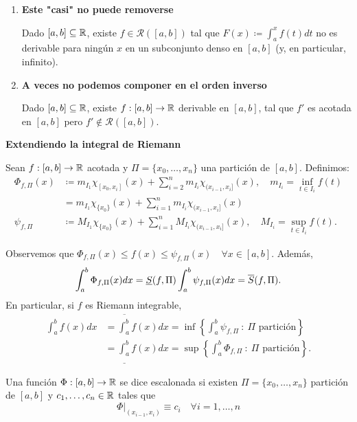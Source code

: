 \documentclass[a4paper]{report}
\begin{document}
	\begin{enumerate}
		\item \textbf{Este "casi" no puede removerse}
		\begin{theorem}[Hankel, 1871]
			Dado $[a,b] \subseteq \mathbb{R}$, existe $f\in\mathcal{R}([a,b])$ tal que $F(x) \coloneq \int_{a}^{x} f(t) dt$ no es derivable para ningún $x$ en un subconjunto denso en $[a,b]$ (y, en particular, infinito).
		\end{theorem}

		\item \textbf{A veces no podemos componer en el orden inverso}
		\begin{theorem}[Volterra, 1881]
			Dado $[a,b]\subseteq\mathbb{R}$, existe $f: [a,b]\to\mathbb{R}$ derivable en $[a,b]$, tal que $f'$ es acotada en $[a,b]$ pero $f' \not\in \mathcal{R} ([a,b])$.
		\end{theorem}
	\end{enumerate}

	\noindent \textbf{Extendiendo la integral de Riemann}

	Sean $f:[a,b]\to\mathbb{R}$ acotada y $\Pi = \{ x_0,\dots,x_n \}$ una partición de $[a,b]$. Definimos:
	\begin{align*}
		\Phi_{f,\Pi}(x) & \coloneq m_{I_1} \chi_{[x_0,x_i]} (x) + \sum_{i=2}^{n} m_{I_i} \chi_{(x_{i-1},x_i]}(x), \quad m_{I_i} = \inf_{t \in I_i} f(t) \\
		& = m_{I_1} \chi_{\{x_0\}}(x) + \sum_{i=1}^{n} m_{I_i} \chi_{(x_{i-1},x_i]}(x) \\
		\psi_{f,\Pi} & \coloneq M_{I_1} \chi_{\{x_0\}}(x) + \sum_{i=1}^{n} M_{I_i} \chi_{(x_{i-1},x_i]}(x), \quad M_{I_i} = \sup_{t\in I_i} f(t)
	.\end{align*}

	Observemos que $\Phi_{f,\Pi}(x) \leq f(x) \leq \psi_{f,\Pi}(x) \quad \forall x \in [a,b]$. Además, 
	\[
	\int_{a}^{b} \Phi_{f,\Pi}(x) dx = \underline{S}(f,\Pi) \\
	\int_{a}^{b} \psi_{f,\Pi}(x) dx = \overline{S}(f,\Pi).
	\]
	\noindent En particular, si $f$ es Riemann integrable,
	\begin{align*}
		\int_{a}^{b} f(x) dx & = \overline{\int_{a}^{b}} f(x) dx = \inf \left\{ \int_{a}^{b} \psi_{f,\Pi} \ : \ \Pi \text{ partición} \right\} \\
		& = \underline{ \int_{a}^{b} } f(x) dx = \sup \left\{ \int_{a}^{b} \Phi_{f,\Pi} \ : \ \Pi \text{ partición} \right\}
	.\end{align*}

	\begin{definition}
		Una función $\Phi : [a,b] \to \mathbb{R}$ se dice escalonada si existen $\Pi = \{ x_0,\dots,x_n \}$ partición de $[a,b]$ y $c_1,\dots,c_n \in \mathbb{R}$ tales que
		\[
		\Phi |_{(x_{i-1},x_i)} \equiv c_i \quad \forall i = 1,\dots,n
		\]
	\end{definition}
\end{document}
